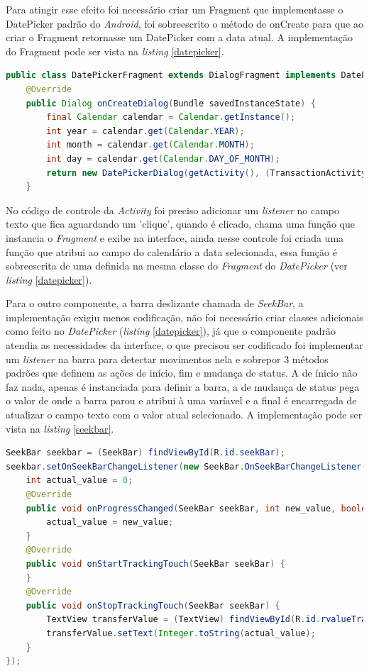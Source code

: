 \documentclass[hidelinks,12pt]{article}
\begin{document}
Para atingir esse efeito foi necess\'ario criar um Fragment que implementasse o DatePicker padr\~ao do \textit{Android}, foi sobreescrito o m\'etodo de onCreate para que ao criar o Fragment retornasse um DatePicker com a data atual. A implementa\c{c}\~ao do Fragment pode ser vista na \textit{listing} \ref{datepicker}.
\newpage
\begin{lstlisting}[language=Java, caption=\textit{Fragment} do calend\'ario, captionpos=b, breaklines=true, label=datepicker]
public class DatePickerFragment extends DialogFragment implements DatePickerDialog.OnDateSetListener{
	@Override
	public Dialog onCreateDialog(Bundle savedInstanceState) {
		final Calendar calendar = Calendar.getInstance();
		int year = calendar.get(Calendar.YEAR);
		int month = calendar.get(Calendar.MONTH);
		int day = calendar.get(Calendar.DAY_OF_MONTH);
		return new DatePickerDialog(getActivity(), (TransactionActivity)getActivity(), year,month,day);
	}
\end{lstlisting}
No c\'odigo de controle da \textit{Activity} foi preciso adicionar um \textit{listener} no campo texto que fica aguardando um 'clique', quando \'e clicado, chama uma fun\c{c}\~ao que instancia o \textit{Fragment} e exibe na interface, ainda nesse controle foi criada uma fun\c{c}\~ao que atribui ao campo do calend\'ario a data selecionada, essa fun\c{c}\~ao \'e sobreescrita de uma definida na mesma classe do \textit{Fragment} do \textit{DatePicker} (ver \textit{listing} \ref{datepicker}).

Para o outro componente, a barra deslizante chamada de \textit{SeekBar}, a implementa\c{c}\~ao exigiu menos codifica\c{c}\~ao, n\~ao foi necess\'ario criar classes adicionais como feito no \textit{DatePicker} (\textit{listing} \ref{datepicker}), j\'a que o componente padr\~ao atendia as necessidades da interface, o que precisou ser codificado foi implementar um \textit{listener} na barra para detectar movimentos nela e sobrepor 3 m\'etodos padr\~oes que definem as a\c{c}\~oes de in\'icio, fim e mudan\c{c}a de status. A de \'inicio n\~ao faz nada, apenas \'e instanciada para definir a barra, a de mudan\c{c}a de status pega o valor de onde a barra parou e atribui \`a uma var\'iavel e a final \'e encarregada de atualizar o campo texto com o valor atual selecionado. A implementa\c{c}\~ao pode ser vista na \textit{listing} \ref{seekbar}.
\newpage
\begin{lstlisting}[language=Java, caption=\textit{SeekBar} do valor, captionpos=b, breaklines=true, label=seekbar]
SeekBar seekbar = (SeekBar) findViewById(R.id.seekBar);
seekbar.setOnSeekBarChangeListener(new SeekBar.OnSeekBarChangeListener(){
	int actual_value = 0;
	@Override
	public void onProgressChanged(SeekBar seekBar, int new_value, boolean b) {
		actual_value = new_value;
	}
	@Override
	public void onStartTrackingTouch(SeekBar seekBar) {
	}
	@Override
	public void onStopTrackingTouch(SeekBar seekBar) {
		TextView transferValue = (TextView) findViewById(R.id.rvalueTransfer);
		transferValue.setText(Integer.toString(actual_value);
	}
});
\end{lstlisting}
\end{document}
